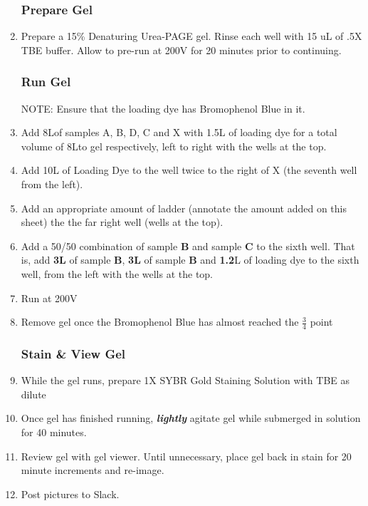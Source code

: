 \documentclass[letterpaper]{article}
\newcommand{\uL}{\micro{}L}
\begin{document}
\begin{enumerate}
\subsubsection{Prepare Gel}
\item{Prepare a 15\% Denaturing Urea-PAGE gel. Rinse each well with 15 uL of .5X TBE buffer. Allow to pre-run at 200V for 20 minutes prior to continuing.}

\subsubsection{Run Gel}
NOTE: Ensure that the loading dye has Bromophenol Blue in it.
\item{Add 8\uL of samples A, B, D, C and X with 1.5\uL{} of loading dye for a total volume of 8\uL to gel respectively, left to right with the wells at the top.}
\item{Add 10\uL{} of Loading Dye to the well twice to the right of X (the seventh well from the left).}
\item{Add an appropriate amount of ladder (annotate the amount added on this sheet) the the far right well (wells at the top).}
\item{Add a 50/50 combination of sample \textbf{B} and sample \textbf{C} to the sixth well. That is, add \textbf{3\uL{}} of sample \textbf{B}, \textbf{3\uL{}} of sample \textbf{B} and \textbf{1.2}\uL{} of loading dye to the sixth well, from the left with the wells at the top.}
\item{Run at 200V}
\item{Remove gel once the Bromophenol Blue has almost reached the $\frac{3}{4}$ point \cite{dnaAgarose}}

\subsubsection{Stain \& View Gel}
\item{While the gel runs, prepare 1X SYBR Gold Staining Solution with TBE as dilute}
\item{Once gel has finished running, \textbf{\textit{lightly}} agitate gel while submerged in solution for 40 minutes.}
\item{Review gel with gel viewer. Until unnecessary, place gel back in stain for 20 minute increments and re-image.}
\item{Post pictures to Slack.}\\
\end{enumerate} 

\end{document}
